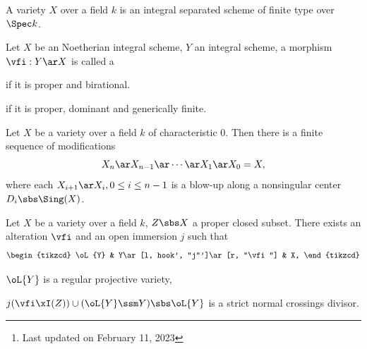 \documentclass[a4paper, twoside]{article}
\title{\tbf{Desingularization}}
\author{\tbf{Notes} by Cong Wen, 02/2023}
\date{}
\begin{document}
\maketitle
\thispagestyle{empty}
\begin{abstract}
	This is my self-use notes\footnote{Last updated on February 11, 2023} on . In 1964 Hironaka\cite{Hironaka1964} proved any variety can be modified into a nonsingular variety in characteristic $0$. In 1996 de Jong\cite{deJong1996} proved any variety can be altered into a nonsingular variety in any characteristic.

	We collect some statements from them. Please reach out if you find anything incorrect.

\end{abstract}
\tableofcontents




\begin{stp}
	A variety $X$ over a field $k$ is an integral separated scheme of finite type over $\Spec k$.
\end{stp}

\begin{dfn}
	Let $X$ be an Noetherian integral scheme, $Y$ an integral scheme, a morphism $\vfi:Y\ar X$ is called a
	\begin{enr}
		\item \cite[2.17]{deJong1996}  if it is proper and birational.
		\item \cite[2.20]{deJong1996}  if it is proper, dominant and generically finite.
	\end{enr}
\end{dfn}


\begin{thm}
	Let $X$ be a variety over a field $k$ of characteristic $0$. Then there is a finite sequence of modifications
	\[
		X_{n}\ar X_{n-1}\ar\cdots\ar X_{1}\ar X_{0}=X,
	\]
	where each $X_{i+1}\ar X_{i}, 0\leq i\leq n-1$ is a blow-up along a nonsingular center $D_{i}\sbs\Sing(X)$.
\end{thm}


\begin{thm}
	Let $X$ be a variety over a field $k$, $Z\sbs X$ a proper closed subset. There exists an alteration $\vfi$ and an open immersion $j$ such that
	\[
		\begin{tikzcd}
			\oL{Y} & Y\ar[l, hook', "j"']\ar[r, "\vfi"] & X,
		\end{tikzcd}
	\]
	\begin{enr}
		\item $\oL{Y}$ is a regular projective variety,
		\item $j(\vfi\xI(Z))\cup(\oL{Y}\ssm Y)\sbs \oL{Y}$ is a strict normal crossings divisor.
	\end{enr}
\end{thm}
\end{document}
